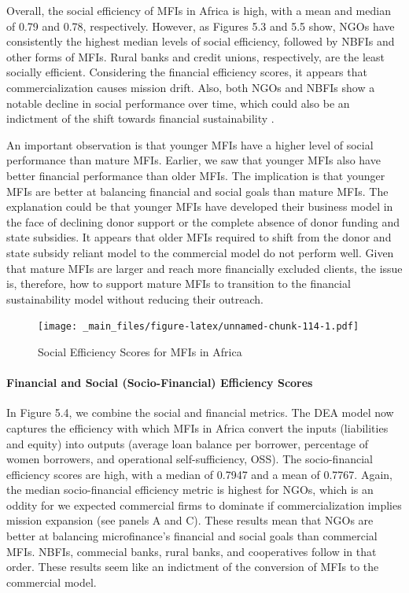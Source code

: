 \documentclass[a4paper, nobind]{templates/ociamthesis}
\begin{document}
Overall, the social efficiency of MFIs in Africa is high, with a mean and median of 0.79 and 0.78, respectively. However, as Figures 5.3 and 5.5 show, NGOs have consistently the highest median levels of social efficiency, followed by NBFIs and other forms of MFIs. Rural banks and credit unions, respectively, are the least socially efficient. Considering the financial efficiency scores, it appears that commercialization causes mission drift. Also, both NGOs and NBFIs show a notable decline in social performance over time, which could also be an indictment of the shift towards financial sustainability \autocite{d2017ngos}.

An important observation is that younger MFIs have a higher level of social performance than mature MFIs. Earlier, we saw that younger MFIs also have better financial performance than older MFIs. The implication is that younger MFIs are better at balancing financial and social goals than mature MFIs. The explanation could be that younger MFIs have developed their business model in the face of declining donor support or the complete absence of donor funding and state subsidies. It appears that older MFIs required to shift from the donor and state subsidy reliant model to the commercial model do not perform well. Given that mature MFIs are larger and reach more financially excluded clients, the issue is, therefore, how to support mature MFIs to transition to the financial sustainability model without reducing their outreach.

\begin{landscape}

\begin{figure}
\centering
\texttt{[image: \_main\_files/figure-latex/unnamed-chunk-114-1.pdf]}
\caption{\label{fig:unnamed-chunk-114}Social Efficiency Scores for MFIs in Africa}
\end{figure}

\end{landscape}

\hypertarget{financial-and-social-socio-financial-efficiency-scores}{%
\paragraph{Financial and Social (Socio-Financial) Efficiency Scores}\label{financial-and-social-socio-financial-efficiency-scores}}

In Figure 5.4, we combine the social and financial metrics. The DEA model now captures the efficiency with which MFIs in Africa convert the inputs (liabilities and equity) into outputs (average loan balance per borrower, percentage of women borrowers, and operational self-sufficiency, OSS). The socio-financial efficiency scores are high, with a median of 0.7947 and a mean of 0.7767. Again, the median socio-financial efficiency metric is highest for NGOs, which is an oddity for we expected commercial firms to dominate if commercialization implies mission expansion (see panels A and C). These results mean that NGOs are better at balancing microfinance's financial and social goals than commercial MFIs. NBFIs, commecial banks, rural banks, and cooperatives follow in that order. These results seem like an indictment of the conversion of MFIs to the commercial model.
\end{document}
